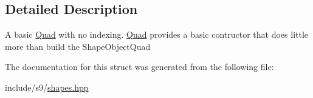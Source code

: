 \subsection{Detailed Description}
A basic \hyperlink{classs9_1_1Quad}{Quad} with no indexing. \hyperlink{classs9_1_1Quad}{Quad} provides a basic contructor that does little more than build the Shape\-Object\-Quad 

The documentation for this struct was generated from the following file\-:\begin{DoxyCompactItemize}
\item 
include/s9/\hyperlink{shapes_8hpp}{shapes.\-hpp}\end{DoxyCompactItemize}
